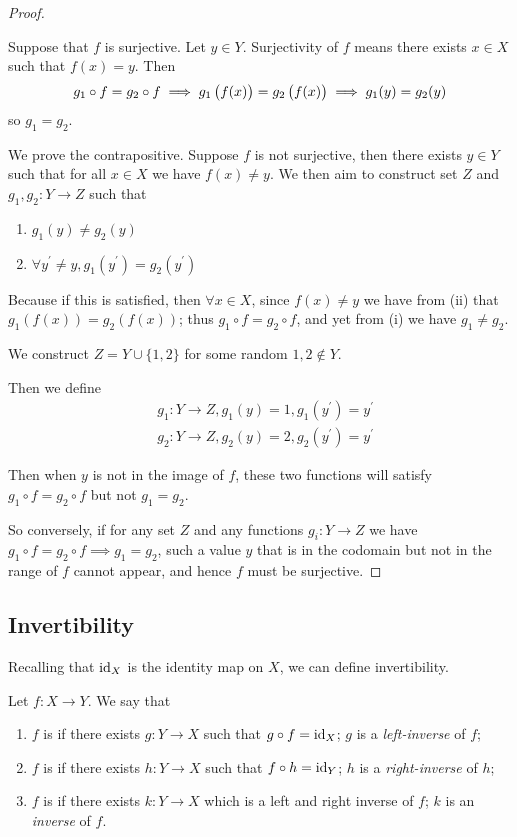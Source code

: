 \begin{proof} \

\fbox{$\implies$} Suppose that $f$ is surjective. Let $y\in Y$. Surjectivity of $f$ means there exists $x\in X$ such that $f(x)=y$. Then
\[g_1\circ f=g_2 \circ f\implies g_1\left(f(x)\right)=g_2\left(f(x)\right)\implies g_1(y)=g_2(y) \]
so $g_1=g_2$.

\fbox{$\impliedby$} We prove the contrapositive. Suppose $f$ is not surjective, then there exists $y \in Y$ such that for all $x \in X$ we have $f(x)\neq y$. We then aim to construct set $Z$ and $g_1,g_2:Y\to Z$ such that
\begin{enumerate}[label=(\roman*)]
\item $g_1(y) \neq g_2(y)$
\item $\forall y^\prime \neq y, g_1(y^\prime)=g_2(y^\prime)$
\end{enumerate}

Because if this is satisfied, then $\forall x \in X$, since $f(x)\neq y$ we have from (ii) that $g_1(f(x))=g_2(f(x))$; thus $g_1 \circ f=g_2 \circ f$, and yet from (i) we have $g_1 \neq g_2$.

We construct $Z=Y\cup\{1,2\}$ for some random $1,2 \notin Y$.

Then we define
\begin{align*}
&g_1:Y\to Z,g_1(y)=1,g_1(y^\prime)=y^\prime\\
&g_2:Y\to Z,g_2(y)=2,g_2(y^\prime)=y^\prime
\end{align*}

Then when $y$ is not in the image of $f$, these two functions will satisfy $g_1 \circ f=g_2 \circ f$ but not $g_1=g_2$.

So conversely, if for any set $Z$ and any functions $g_i:Y \to Z$ we have $g_1 \circ f=g_2 \circ f \implies g_1=g_2$, such a value $y$ that is in the codomain but not in the range of $f$ cannot appear, and hence $f$ must be surjective.
\end{proof}

\subsection{Invertibility}
Recalling that $\operatorname{id}_X$ is the identity map on $X$, we can define invertibility.

\begin{definition}[Invertibility]
Let $f:X\to Y$. We say that
\begin{enumerate}[label=(\roman*)]
\item $f$ is  if there exists $g:Y\to X$ such that $g\circ f=\operatorname{id}_X$; $g$ is a \emph{left-inverse} of $f$;
\item $f$ is  if there exists $h:Y\to X$ such that $f\circ h=\operatorname{id}_Y$; $h$ is a \emph{right-inverse} of $h$;
\item $f$ is  if there exists $k:Y\to X$ which is a left and right inverse of $f$; $k$ is an \emph{inverse} of $f$.
\end{enumerate}
\end{definition}

